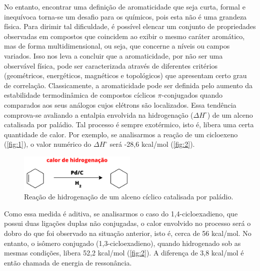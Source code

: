 No entanto, encontrar uma definição de aromaticidade que seja curta, formal e inequívoca torna-se um desafio para os químicos, pois esta não é uma grandeza física. Para dirimir tal dificuldade, é possível elencar um conjunto de propriedades observadas em compostos que coincidem ao exibir o mesmo caráter aromático, mas de forma multidimensional, ou seja, que concerne a níveis ou campos variados. Isso nos leva a concluir que a aromaticidade, por não ser uma observável física, pode ser caracterizada através de diferentes critérios (geométricos, energéticos, magnéticos e topológicos) que apresentam certo grau de correlação. Classicamente, a aromaticidade pode ser definida pelo aumento da estabilidade termodinâmica de compostos cíclicos $\pi$-conjugados quando comparados aos seus análogos cujos elétrons são localizados. Essa tendência comprova-se avaliando a entalpia envolvida na hidrogenação ($\Delta H^\circ$) de um alceno catalisada por paládio. Tal processo é sempre exotérmico, isto é, libera uma certa quantidade de calor. Por exemplo, se analisarmos a reação de um cicloexeno (\autoref{fig:1}), o valor numérico do $\Delta H^\circ$ será -28,6 kcal/mol (\autoref{fig:2}). 


\begin{figure}[htb]
	\caption{\label{fig:1} Reação de hidrogenação de um alceno cíclico catalisada por paládio.}
	\begin{center}
		\includegraphics[width=0.5\textwidth]{images/fig1.png}
	\end{center}
\end{figure}

Como essa medida é aditiva, se analisarmos o caso do 1,4-cicloexadieno, que possui duas ligações duplas não conjugadas, o calor envolvido no processo será o dobro do que foi observado na situação anterior, isto é, cerca de 56 kcal/mol. No entanto, o isômero conjugado (1,3-cicloexadieno), quando hidrogenado sob as mesmas condições, libera 52,2 kcal/mol (\autoref{fig:2}). A diferença de 3,8 kcal/mol é então chamada de energia de ressonância.

